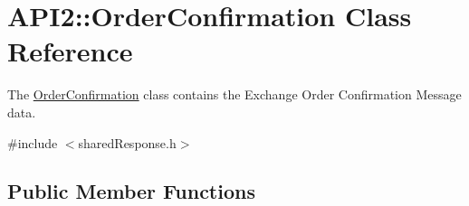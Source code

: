 \hypertarget{class_a_p_i2_1_1_order_confirmation}{\section{A\-P\-I2\-:\-:Order\-Confirmation Class Reference}
\label{class_a_p_i2_1_1_order_confirmation}
}


The \hyperlink{class_a_p_i2_1_1_order_confirmation}{Order\-Confirmation} class contains the Exchange Order Confirmation Message data.  




{\ttfamily \#include $<$shared\-Response.\-h$>$}

\subsection*{Public Member Functions}
